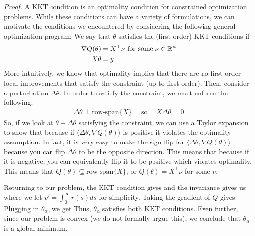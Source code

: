 \begin{proof}
A KKT condition is an optimality condition for constrained optimization problems. While these conditions can have a variety of formulations, we can motivate the conditions we encountered by considering the following general optimization program:
We say that \(\theta\) satisfies the (first order) KKT conditions if
\begin{align}
    \nabla Q(\theta) &= X^\top \nu \text{ for some } \nu \in \mathbb R^n \\
    X\theta &=y
\end{align}
More intuitively, we know that optimality implies that there are no first order local improvements that satisfy the constraint (up to first order). Then, consider a perturbation \(\Delta \theta\). In order to satisfy the constraint, we must enforce the following:
\begin{align}
\Delta \theta \perp \text{row-span}\{X\}  \quad \text{ so } \quad X \Delta \theta = 0
\end{align}
So, if we look at \(\theta + \Delta \theta \) satisfying the constraint, we can use a Taylor expansion to show that
because if \( \langle \Delta \theta, \nabla Q(\theta) \rangle\) is positive it violates the optimality assumption.
In fact, it is very easy to make the sign flip for \( \langle \Delta \theta, \nabla Q(\theta) \rangle\) because you can flip \(\Delta \theta\) to be the opposite direction. This means that
because if it is negative, you can equivalently flip it to be positive which violates optimality.
This means that \(Q(\theta) \subseteq \text{row-span}\{X\}\), or \(Q(\theta) = X^\top \nu\) for some $\nu$.

Returning to our problem, the KKT condition gives
and the invariance gives us
where we let \(v' = \int_0^\infty r(s) ds\) for simplicity.
Taking the gradient of \(Q\) gives
Plugging in \(\theta_\alpha\), we get
Thus, \(\theta_\alpha\) satisfies both KKT conditions. Even further, since our problem is convex (we do not formally argue this), we conclude that \(\theta_\alpha\) is a global minimum.
\end{proof}

